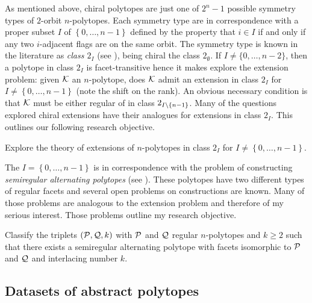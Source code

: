 \documentclass[a4paper,12pt,english]{article}
\begin{document}
As mentioned above, chiral polytopes are just one of  $2^{n}-1$ possible symmetry types of $2$-orbit $n$-polytopes.
Each symmetry type are in correspondence with a proper subset $I$ of $\left\{ 0, \dots, n-1 \right\} $ defined by the property that $i \in I$ if and only if any two $i$-adjacent flags are on the same orbit.
The symmetry type is known in the literature as \emph{class $2_{I}$ } (see \cite{PellPotTol2019_ExistenceResultTwo,Matteo2016_TwoOrbitConvex,Hubard2010_TwoOrbitPolyhedra}), being chiral  the class $2_{\emptyset}$.
If $I \neq \{0, \dots, n-2\}$, then a polytope in class $2_{I} $ is facet-transitive hence it makes explore the extension problem: given $\mathcal{K}$ an $n$-polytope, does $\mathcal{K}$ admit an extension in class $2_{I}$ for $I \neq \left\{ 0, \dots, n-1 \right\} $ (note the shift on the rank).
An obvious necessary condition is that $\mathcal{K}$ must be either regular of in class $2_{I\setminus\left\{ n-1  \right\}}$.
Many of the questions explored chiral extensions have their analogues for extensions in class $2_{I}$.
This outlines our following research objective.

\begin{obj}\label{obj:2_I}
  Explore the theory of extensions of $n$-polytopes in class $2_{I}$ for $I \neq \left\{ 0, \dots, n-1 \right\} $.
\end{obj}

The  $I=\left\{ 0, \dots, n-1 \right\} $ is in correspondence with the problem of constructing \emph{semiregular alternating polytopes} (see \cite{MonsoSchul2022_InterlacingNumberAlternating,MonsoSchul2020_UniversalAlternatingSemiregular,MonsoSchul2019_AssemblyProblemAlternating,MonsoSchul2012_SemiregularPolytopesAmalgamated}).
These polytopes have two different types of regular facets and several open problems on constructions are known.
Many of those problems are analogous to the extension problem and therefore of my serious interest.
Those problems outline my research objective.

\begin{obj}\label{obj:semiregular}
  Classify the triplets $(\mathcal{P}, \mathcal{Q}, k)$ with $\mathcal{P}$ and $\mathcal{Q}$ regular $n$-polytopes and $k \geq 2$ such that there exists a semiregular alternating polytope with facets isomorphic to $\mathcal{P}$ and $\mathcal{Q}$ and interlacing number $k$.
\end{obj}

\subsection*{Datasets of abstract polytopes} \label{sec:datasets}
\end{document}
